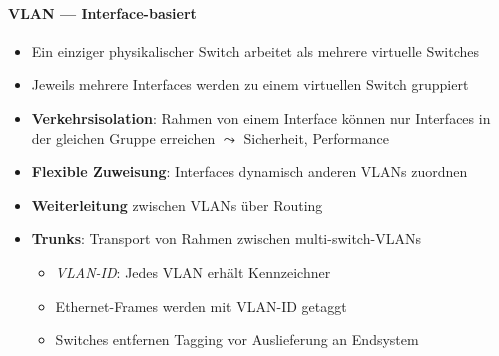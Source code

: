 \paragraph{VLAN --- Interface-basiert}
\begin{itemize}
	\item Ein einziger physikalischer Switch arbeitet als mehrere virtuelle Switches
	\item Jeweils mehrere Interfaces werden zu einem virtuellen Switch gruppiert
  \item \textbf{Verkehrsisolation}: Rahmen von einem Interface können nur Interfaces in der gleichen Gruppe erreichen \( \leadsto \) Sicherheit, Performance
  \item \textbf{Flexible Zuweisung}: Interfaces dynamisch anderen VLANs zuordnen
  \item \textbf{Weiterleitung} zwischen VLANs über Routing
  \item \textbf{Trunks}: Transport von Rahmen zwischen multi-switch-VLANs
  \begin{itemize}
    \item \emph{VLAN-ID}: Jedes VLAN erhält Kennzeichner
    \item Ethernet-Frames werden mit VLAN-ID getaggt
    \item Switches entfernen Tagging vor Auslieferung an Endsystem
  \end{itemize}
\end{itemize}